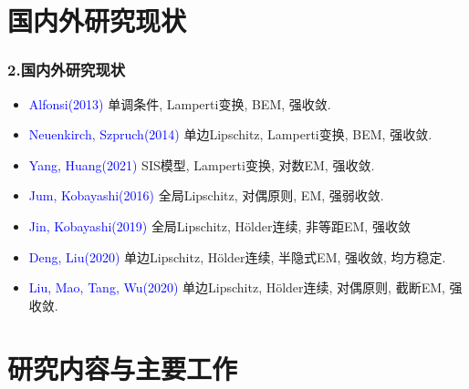 \documentclass[notheorems,10pt,compress]{beamer}
\numberwithin{figure}{section}
\numberwithin{table}{section}
\numberwithin{equation}{section}
\numberwithin{theorem}{section}
\numberwithin{definition}{section}
\numberwithin{lemma}{section}
\numberwithin{proposition}{section}
\numberwithin{corollary}{section}
\theoremstyle{example}
\newcommand{\blue}[1]{\textcolor{blue}{#1}}
\begin{document}
	
	\section{国内外研究现状}
	
	\begin{frame}
		\frametitle{2.国内外研究现状}
		\begin{itemize}
			\setlength{\itemsep}{10pt}
			\item \blue{ Alfonsi(2013) } 单调条件, Lamperti变换, BEM, 强收敛. 
			\item \blue{Neuenkirch, Szpruch(2014)} 单边Lipschitz, Lamperti变换, BEM, 强收敛.
			\item \blue{ Yang, Huang(2021) } SIS模型, Lamperti变换, 对数EM, 强收敛.
		\end{itemize}
		\begin{itemize}
			\setlength{\itemsep}{10pt}
			\item \blue{ Jum, Kobayashi(2016) } 全局Lipschitz, 对偶原则, EM, 强弱收敛.
			\item \blue{ Jin, Kobayashi(2019) }  全局Lipschitz, H\"{o}lder连续, 非等距EM, 强收敛
			\item \blue{ Deng, Liu(2020) } 单边Lipschitz, H\"{o}lder连续, 半隐式EM, 强收敛, 均方稳定. 
			\item \blue{Liu, Mao, Tang, Wu(2020) } 单边Lipschitz,  H\"{o}lder连续, 对偶原则, 截断EM, 强收敛.
		\end{itemize}
	\end{frame}
	
	\section{研究内容与主要工作}
	
\end{document}
